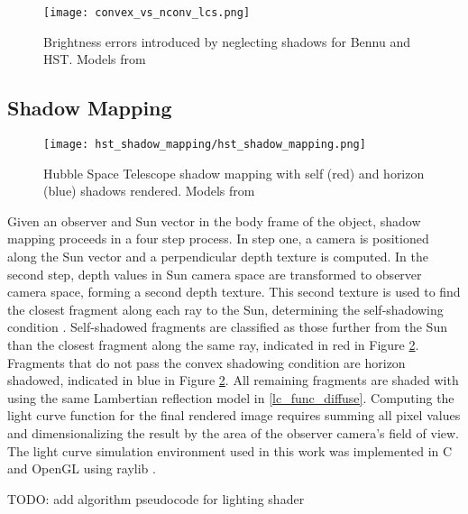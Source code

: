 \begin{figure}[!htb]
  \centering
  \texttt{[image: convex\_vs\_nconv\_lcs.png]}
  \caption{Brightness errors introduced by neglecting shadows for Bennu and HST. Models from \cite{nasa_models}}
  \label{fig:hst_bennu_shadows}
\end{figure}

\subsection{Shadow Mapping}

\begin{figure}[!htb]
  \centering
  \texttt{[image: hst\_shadow\_mapping/hst\_shadow\_mapping.png]}
  \caption{Hubble Space Telescope shadow mapping with self (red) and horizon (blue) shadows rendered. Models from \cite{nasa_models}}
  \label{fig:hst_shadows_map}
\end{figure}

Given an observer and Sun vector in the body frame of the object, shadow mapping proceeds in a four step process. In step one, a camera is positioned along the Sun vector and a perpendicular depth texture is computed. In the second step, depth values in Sun camera space are transformed to observer camera space, forming a second depth texture. This second texture is used to find the closest fragment along each ray to the Sun, determining the self-shadowing condition \cite{brabec2002}. Self-shadowed fragments are classified as those further from the Sun than the closest fragment along the same ray, indicated in red in Figure \ref{fig:hst_shadows_map}. Fragments that do not pass the convex shadowing condition are horizon shadowed, indicated in blue in Figure \ref{fig:hst_shadows_map}. All remaining fragments are shaded with using the same Lambertian reflection model in \ref{lc_func_diffuse}. Computing the light curve function for the final rendered image requires summing all pixel values and dimensionalizing the result by the area of the observer camera's field of view. The light curve simulation environment used in this work was implemented in C and OpenGL using raylib \cite{raylib}.

TODO: add algorithm pseudocode for lighting shader